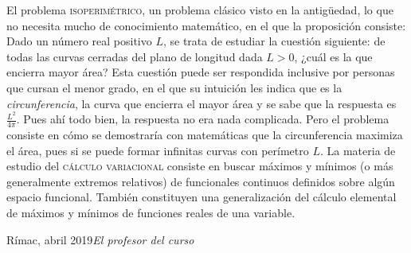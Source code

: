 \foreword
El problema \textsc{isoperimétrico}, un problema clásico visto en la antigüedad, lo que no necesita mucho de conocimiento matemático, en el que la proposición consiste: Dado
un número real positivo $L$, se trata de estudiar la cuestión siguiente: de todas las curvas cerradas del plano de longitud dada $L>0$, ¿cuál es la que encierra mayor área?
Esta cuestión puede ser respondida inclusive por personas que cursan el menor grado, en el que su intuición les indica que es la \emph{circunferencia}, la curva que encierra el mayor área y se sabe que la respuesta es $\tfrac{L^2}{4\pi}$. Pues ahí todo bien, la respuesta no era nada complicada. Pero el problema consiste en cómo se demostraría con matemáticas que la circunferencia maximiza el área, pues si se puede formar infinitas curvas con perímetro $L$. La materia de estudio del \textsc{cálculo variacional} consiste en buscar máximos y mínimos (o más generalmente extremos relativos) de funcionales continuos definidos sobre algún espacio funcional. También constituyen una generalización del cálculo elemental de máximos y mínimos de funciones reales de una variable.\par
\vspace{\baselineskip}
\begin{flushright}\noindent
Rímac, abril 2019\hfill {\it El profesor del curso}
\end{flushright}